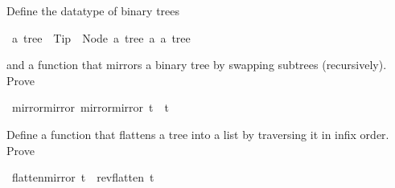 \begin{isabelle}%
%
\begin{isamarkuptext}%
\noindent
Define the datatype of binary trees%
\end{isamarkuptext}%
\ {\isacharprime}a\ tree\ {\isacharequal}\ Tip\ {\isacharbar}\ Node\ {\isachardoublequote}{\isacharprime}a\ tree{\isachardoublequote}\ {\isacharprime}a\ {\isachardoublequote}{\isacharprime}a\ tree{\isachardoublequote}%
\begin{isamarkuptext}%
\noindent
and a function  that mirrors a binary tree
by swapping subtrees (recursively). Prove%
\end{isamarkuptext}%
\ mirror{\isacharunderscore}mirror{\isacharcolon}\ {\isachardoublequote}mirror{\isacharparenleft}mirror\ t{\isacharparenright}\ {\isacharequal}\ t{\isachardoublequote}%
\begin{isamarkuptext}%
\noindent
Define a function  that flattens a tree into a list
by traversing it in infix order. Prove%
\end{isamarkuptext}%
\ {\isachardoublequote}flatten{\isacharparenleft}mirror\ t{\isacharparenright}\ {\isacharequal}\ rev{\isacharparenleft}flatten\ t{\isacharparenright}{\isachardoublequote}\end{isabelle}%
